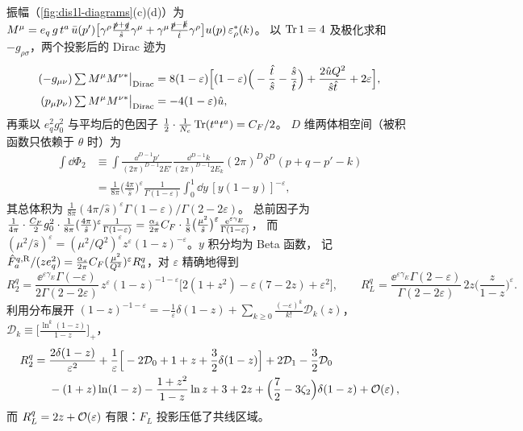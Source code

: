 振幅（\cref{fig:dis1l-diagrams}(c)(d)）为
$M^\mu=e_q\,g\,t^a\,\bar u(p')\big[\gamma^\rho\frac{\slashed{p}+\slashed{q}}{\hat s}\gamma^\mu+\gamma^\mu\frac{\slashed{p}-\slashed{k}}{\hat t}\gamma^\rho\big]u(p)\,\varepsilon^*_\rho(k)$。
以 $\operatorname{Tr}1=4$ 及极化求和 $-g_{\rho\sigma}$，两个投影后的 Dirac 迹为
\begin{align}
(-g_{\mu\nu})\,{\textstyle\sum}\,M^\mu M^{\nu*}\big|_{\rm Dirac}
&=8(1-\varepsilon)\Big[(1-\varepsilon)\Big(-\frac{\hat t}{\hat s}-\frac{\hat s}{\hat t}\Big)+\frac{2\hat uQ^2}{\hat s\hat t}+2\varepsilon\Big],
\nonumber\\
(p_\mu p_\nu)\,{\textstyle\sum}\,M^\mu M^{\nu*}\big|_{\rm Dirac}&=-4(1-\varepsilon)\hat u ,\label{eq:dis1l-meq}
\end{align}
再乘以 $e_q^2g_0^2$ 与平均后的色因子 $\frac12\cdot\frac1{N_c}\operatorname{Tr}(t^at^a)=C_F/2$。
$D$ 维两体相空间（被积函数只依赖于 $\theta$ 时）为
\begin{align}
\int\dd\Phi_2&\equiv\int\frac{\dd^{D-1}p'}{(2\pi)^{D-1}2E'}\frac{\dd^{D-1}k}{(2\pi)^{D-1}2E_k}(2\pi)^D\delta^D(p+q-p'-k)
\nonumber\\
&=\frac{1}{8\pi}\Big(\frac{4\pi}{\hat s}\Big)^{\varepsilon}\frac{1}{\Gamma(1-\varepsilon)}\int_0^1\dd y\,[y(1-y)]^{-\varepsilon},
\label{eq:dis1l-ps}
\end{align}
其总体积为 $\frac{1}{8\pi}(4\pi/\hat s)^\varepsilon\Gamma(1-\varepsilon)/\Gamma(2-2\varepsilon)$。
总前因子为 $\frac{1}{4\pi}\cdot\frac{C_F}{2}g_0^2\cdot\frac{1}{8\pi}(\frac{4\pi}{\hat s})^\varepsilon\frac{1}{\Gamma(1-\varepsilon)}
=\frac{\alpha_s}{2\pi}C_F\cdot\frac18\big(\frac{\mu^2}{\hat s}\big)^{\varepsilon}\frac{\mathrm{e}^{\varepsilon\gamma_E}}{\Gamma(1-\varepsilon)}$，
而 $(\mu^2/\hat s)^\varepsilon=(\mu^2/Q^2)^\varepsilon z^\varepsilon(1-z)^{-\varepsilon}$。$y$ 积分均为 Beta 函数，
记 $\hat F_a^{q,\rm R}/(ze_q^2)=\frac{\alpha_s}{2\pi}C_F(\frac{\mu^2}{Q^2})^\varepsilon R_a^q$，对 $\varepsilon$ 精确地得到
\begin{equation}\label{eq:dis1l-Rq}
R_2^q=\frac{\ee^{\varepsilon\gamma_E}\Gamma(-\varepsilon)}{2\Gamma(2-2\varepsilon)}\,z^{\varepsilon}(1-z)^{-1-\varepsilon}
\big[2(1+z^2)-\varepsilon(7-2z)+\varepsilon^2\big],\qquad
R_L^q=\frac{\ee^{\varepsilon\gamma_E}\Gamma(2-\varepsilon)}{\Gamma(2-2\varepsilon)}\,2z\Big(\frac{z}{1-z}\Big)^{\varepsilon}.
\end{equation}
利用分布展开
$(1-z)^{-1-\varepsilon}=-\frac{1}{\varepsilon}\delta(1-z)+\sum_{k\ge0}\frac{(-\varepsilon)^k}{k!}\mathcal D_k(z)$，
$\mathcal D_k\equiv\big[\frac{\ln^k(1-z)}{1-z}\big]_+$，
\begin{align}
R_2^q={}&\frac{2\delta(1-z)}{\varepsilon^2}+\frac{1}{\varepsilon}\Big[-2\mathcal D_0+1+z+\frac32\delta(1-z)\Big]
+2\mathcal D_1-\frac32\mathcal D_0\nonumber\\
&-(1+z)\ln(1-z)-\frac{1+z^2}{1-z}\ln z+3+2z+\Big(\frac72-3\zeta_2\Big)\delta(1-z)+\mathcal{O}\!\left(\varepsilon\right),
\label{eq:dis1l-Rqexp}
\end{align}
而 $R_L^q=2z+\mathcal{O}\!\left(\varepsilon\right)$ 有限：$F_L$ 投影压低了共线区域。

